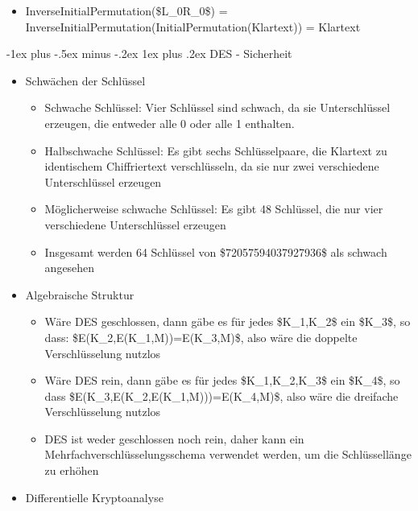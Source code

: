 \documentclass[a4paper]{article}
\makeatletter
\renewcommand{\subsubsection}{\@startsection{subsubsection}{3}{0mm}%
 {-1ex plus -.5ex minus -.2ex}%
 {1ex plus .2ex}%
 {\normalfont\small\bfseries}}
\makeatother
\begin{document}
\begin{multicols}{3}
\begin{itemize}
              \begin{itemize}
                  \item
                        InverseInitialPermutation(\$L\_0\textbar\textbar R\_0\$) =
                        InverseInitialPermutation(InitialPermutation(Klartext)) = Klartext
              \end{itemize}
    \end{itemize}


    \subsubsection{DES - Sicherheit}

    \begin{itemize}
        \item
              Schwächen der Schlüssel

              \begin{itemize}
                  \item
                        Schwache Schlüssel: Vier Schlüssel sind schwach, da sie
                        Unterschlüssel erzeugen, die entweder alle 0 oder alle 1 enthalten.
                  \item
                        Halbschwache Schlüssel: Es gibt sechs Schlüsselpaare, die Klartext
                        zu identischem Chiffriertext verschlüsseln, da sie nur zwei
                        verschiedene Unterschlüssel erzeugen
                  \item
                        Möglicherweise schwache Schlüssel: Es gibt 48 Schlüssel, die nur
                        vier verschiedene Unterschlüssel erzeugen
                  \item
                        Insgesamt werden 64 Schlüssel von \$72057594037927936\$ als schwach
                        angesehen
              \end{itemize}
        \item
              Algebraische Struktur

              \begin{itemize}
                  \item
                        Wäre DES geschlossen, dann gäbe es für jedes \$K\_1,K\_2\$ ein
                        \$K\_3\$, so dass: \$E(K\_2,E(K\_1,M))=E(K\_3,M)\$, also wäre die
                        doppelte Verschlüsselung nutzlos
                  \item
                        Wäre DES rein, dann gäbe es für jedes \$K\_1,K\_2,K\_3\$ ein
                        \$K\_4\$, so dass \$E(K\_3,E(K\_2,E(K\_1,M)))=E(K\_4,M)\$, also wäre
                        die dreifache Verschlüsselung nutzlos
                  \item
                        DES ist weder geschlossen noch rein, daher kann ein
                        Mehrfachverschlüsselungsschema verwendet werden, um die
                        Schlüssellänge zu erhöhen
              \end{itemize}
        \item
              Differentielle Kryptoanalyse


\end{itemize}
\end{multicols}
\end{document}
